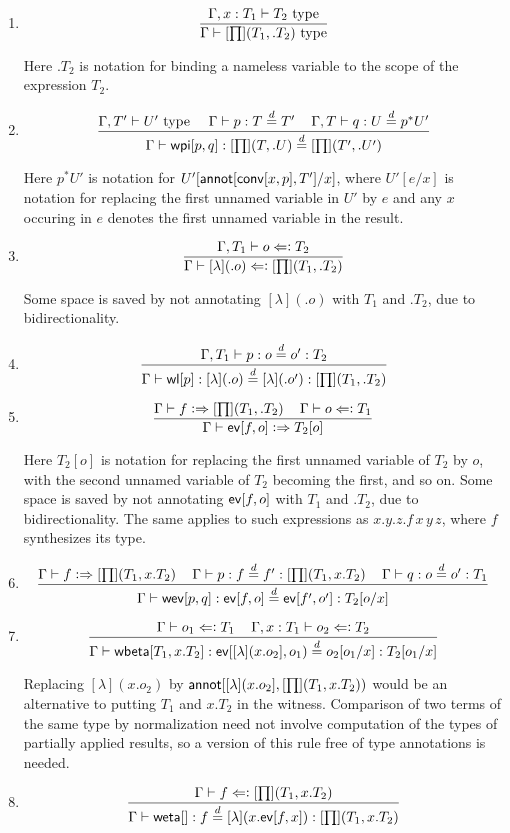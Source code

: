 \documentclass[11pt]{article}
\newcommand{\eqd}{\stackrel{d}{=}}
\newcommand{\spc}{{\,\,\,\,\,\,\,}}
\newcommand{\synth}{\vcentcolon\Rightarrow}
\newcommand{\force}{\Leftarrow\vcentcolon}
\newcommand{\Type}{\mathop{{\, \rm type}}}
\newcommand{\ha}[2]{#1[#2]}
\newcommand{\weta}{{\sf weta}}
\newcommand{\annot}{{\sf annot}}
\newcommand{\conv}{{\sf conv}}
\newcommand{\ev}{{\sf ev}}
\newcommand{\wbeta}{{\sf wbeta}}
\newcommand{\wev}{{\sf wev}}
\newcommand{\wl}{{\sf wl}}
\newcommand{\wpi}{{\sf wpi}}
\begin{document}
\begin{enumerate}

\item 
$$\frac{\Gamma, x:T_1\vdash T_2\Type}{\Gamma\vdash [\prod](T_1,.T_2)\Type}$$

Here $.T_2$ is notation for binding a nameless variable to the scope of the expression $T_2$.

\item 
$$ \frac{ 
  \Gamma, T' \vdash U'  \Type      \spc 
  \Gamma     \vdash p:T \eqd T'    \spc
  \Gamma, T  \vdash q:U \eqd p^*U'
  } {
  \Gamma     \vdash \ha\wpi{p,q}:[\prod](T,.U)\eqd [\prod](T',.U')
}$$

Here ${p}^*U'$ is notation for $U'[\ha\annot{\ha\conv{x,p},T'}/x]$,
where $U'[e/x]$ is notation for replacing the first unnamed variable in
$U'$ by $e$ and any $x$ occuring in $e$ denotes the first unnamed variable in
the result.

\item 
$$\frac{\Gamma, T_1\vdash o \force T_2}{\Gamma\vdash [\lambda](.o) \force [\prod](T_1,.T_2)}$$

Some space is saved by not annotating $[\lambda](.o)$ with $T_1$ and $.T_2$, due to bidirectionality.

\item 
$$\frac{\Gamma, T_1\vdash p : o\eqd o' : T_2}{\Gamma\vdash \ha\wl{p} : [\lambda](.o)\eqd [\lambda](.o') : [\prod](T_1,.T_2)}$$

\item 
$$\frac{\Gamma\vdash f \synth [\prod](T_1,.T_2)\spc \Gamma\vdash o \force T_1}{\Gamma\vdash \ha\ev{f,o} \synth T_2[o]}$$

Here $T_2[o]$ is notation for replacing the first unnamed variable of
$T_2$ by $o$, with the second unnamed variable of $T_2$ becoming the first, and
so on.  Some space is saved by not annotating $\ha\ev{f,o}$ with $T_1$ and
$.T_2$, due to bidirectionality.  The same applies to such expressions as
$x.y.z.f\, x\, y\, z$, where $f$ synthesizes its type.

\item 
$$\frac{\Gamma\vdash f \synth [\prod](T_1,x.T_2) \spc \Gamma\vdash p : f \eqd f' : [\prod](T_1,x.T_2)\spc \Gamma\vdash q : o \eqd o' : T_1}{\Gamma\vdash \ha\wev{p,q} : \ha\ev{f,o} \eqd \ha\ev{f',o'} : T_2[o/x]}$$

\item 
$$\frac{ \Gamma\vdash o_1 \force T_1\spc \Gamma, x:T_1\vdash o_2 \force T_2}{\Gamma\vdash \ha\wbeta{T_1,x.T_2} : \ha\ev{[\lambda](x.o_2},o_1) \eqd o_2[o_1/x] : T_2[o_1/x]}$$

Replacing $[\lambda](x.o_2)$ by $\ha\annot{[\lambda](x.o_2},[\prod](T_1,x.T_2))$ would be an alternative to putting $T_1$ and $x.T_2$ in the witness.
Comparison of two terms of the same type by normalization need not involve
computation of the types of partially applied results, so a version of this
rule free of type annotations is needed.

\item 
$$\frac{\Gamma\vdash f \force [\prod](T_1,x.T_2)}{\Gamma\vdash \ha\weta{} : f \eqd [\lambda](x.\ha\ev{f,x}) : [\prod](T_1,x.T_2)}$$ 

\end{enumerate}



\end{document}
